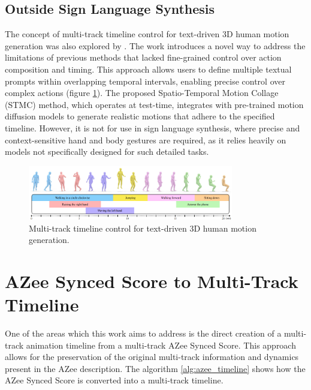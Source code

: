 \documentclass[../../main.tex]{subfiles}
\begin{document}
\subsection{Outside Sign Language Synthesis}
\label{ch:multi_track:related_work:other_multi_track}

The concept of multi-track timeline control for text-driven 3D human motion generation was also explored by \cite{petrovich24stmc}. The work introduces a novel way to address the limitations of previous methods that lacked fine-grained control over action composition and timing. This approach allows users to define multiple textual prompts within overlapping temporal intervals, enabling precise control over complex actions (figure \ref{fig:multi_track_other}). The proposed Spatio-Temporal Motion Collage (STMC) method, which operates at test-time, integrates with pre-trained motion diffusion models to generate realistic motions that adhere to the specified timeline. However, it is not for use in sign language synthesis, where precise and context-sensitive hand and body gestures are required, as it relies heavily on models not specifically designed for such detailed tasks.

\begin{figure}
    \centering
    \includegraphics[width=0.8\textwidth]{chapters/multi_track/images/multi_track_other.png}
    \caption{Multi-track timeline control for text-driven 3D human motion generation.}
    \label{fig:multi_track_other}
\end{figure}

\section{AZee Synced Score to Multi-Track Timeline}
\label{ch:multi_track:score_to_timeline}

One of the areas which this work aims to address is the direct creation of a multi-track animation timeline from a multi-track AZee Synced Score. This approach allows for the preservation of the original multi-track information and dynamics present in the AZee description. The algorithm \ref{alg:azee_timeline} shows how the AZee Synced Score is converted into a multi-track timeline.
\end{document}
